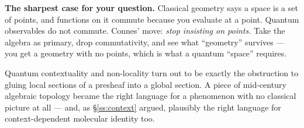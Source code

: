\begin{auditbox}[title={4. Non-commutative geometry \normalfont(Connes, 1980s; \textit{Noncommutative Geometry}, 1994)}]
\textbf{The sharpest case for your question.} Classical geometry says a space is a set of points, and
functions on it commute because you evaluate at a point. Quantum observables do not commute. Connes'
move: \emph{stop insisting on points.} Take the algebra as primary, drop commutativity, and see what
``geometry'' survives --- you get a geometry with no points, which is what a quantum ``space''
requires.
\begin{center}
\end{center}
\end{auditbox}

\begin{auditbox}[title={5. Sheaf-theoretic contextuality \normalfont(Abramsky \& Brandenburger, \textit{New J.\ Phys.}, 2011)}]
Quantum contextuality and non-locality turn out to be exactly the obstruction to gluing local
sections of a presheaf into a global section. A piece of mid-century algebraic topology became the
right language for a phenomenon with no classical picture at all --- and, as \S\ref{ss:context}
argued, plausibly the right language for context-dependent molecular identity too.
\end{auditbox}
